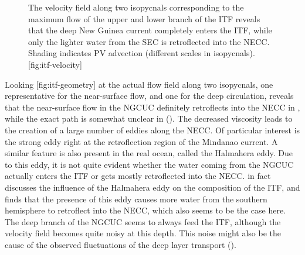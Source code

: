 \begin{figure}
	\begin{sidecaption}{The velocity field along two isopycnals corresponding to the maximum flow of the upper and lower branch of the \ac{ITF} reveals that the deep New Guinea current completely enters the \ac{ITF}, while only the lighter water from the \ac{SEC} is retroflected into the \ac{NECC}. Shading indicates \ac{PV} advection (different scales in isopycnals).}[fig:itf-velocity]
	\antimpjustification
	\end{sidecaption}
\end{figure}

\pagebreak

Looking%
[fig:itf-geometry]%
{}%
at the actual flow field along two isopycnals, one representative for the near-surface flow, and one for the deep circulation, reveals that the near-surface flow in the \ac{NGCUC} definitely retroflects into the \ac{NECC} in , while the exact path is somewhat unclear in  (). The decreased viscosity leads to the creation of a large number of eddies along the \ac{NECC}. Of particular interest is the strong eddy right at the retroflection region of the Mindanao current. A similar feature is also present in the real ocean, called the Halmahera eddy. Due to this eddy, it is not quite evident whether the water coming from the \ac{NGCUC} actually enters the \ac{ITF} or gets mostly retroflected into the \ac{NECC}. \citet{wajsowicz2} in fact discusses the influence of the Halmahera eddy on the composition of the \ac{ITF}, and finds that the presence of this eddy causes more water from the southern hemisphere to retroflect into the \ac{NECC}, which also seems to be the case here. The deep branch of the \ac{NGCUC} seems to always feed the \ac{ITF}, although the velocity field becomes quite noisy at this depth. This noise might also be the cause of the observed fluctuations of the deep layer transport ().

